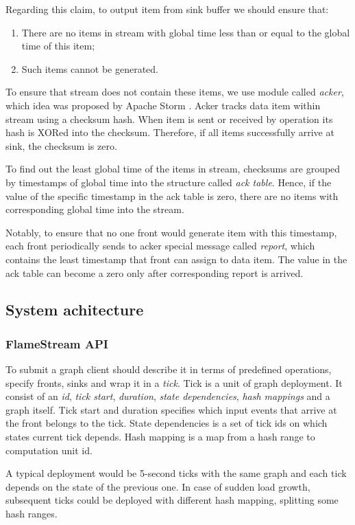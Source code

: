 Regarding this claim, to output item from sink buffer we should ensure that:
\begin{enumerate}
    \item There are no items in stream with global time less than or equal to the global time of this item;
    \item Such items cannot be generated.
\end{enumerate}

To ensure that stream does not contain these items, we use module called {\it acker}, which idea was proposed by Apache Storm \cite{apache:storm}. Acker tracks data item within stream using a checksum hash. When item is sent or received by operation its hash is XORed into the checksum. Therefore, if all items successfully arrive at sink, the checksum is zero. 

To find out the least global time of the items in stream, checksums are grouped by timestamps of global time into the structure called {\it ack table}. Hence, if the value of the specific timestamp in the ack table is zero, there are no items with corresponding global time into the stream. 

Notably, to ensure that no one front would generate item with this timestamp, each front periodically sends to acker special message called {\it report}, which contains the least timestamp that front can assign to data item. The value in the ack table can become a zero only after corresponding report is arrived.  

\subsection{System achitecture}

\subsubsection{FlameStream API}
To submit a graph client should describe it in terms of predefined operations, specify fronts, sinks and wrap it in a {\it tick}. Tick is a unit of graph deployment. It consist of an {\it id}, {\it tick start}, {\it duration}, {\it state dependencies}, {\it hash mappings} and a graph itself. Tick start and duration specifies which input events that arrive at the front belongs to the tick. State dependencies is a set of tick ids on which states current tick depends. Hash mapping is a map from a hash range to computation unit id. 

A typical deployment would be 5-second ticks with the same graph and each tick depends on the state of the previous one. In case of sudden load growth, subsequent ticks could be deployed with different hash mapping, splitting some hash ranges.

